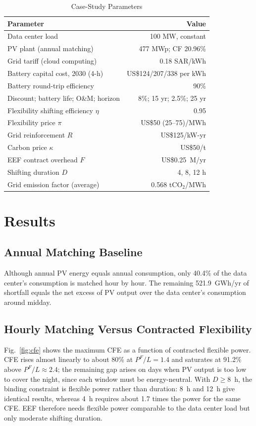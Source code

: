 \documentclass[conference]{IEEEtran}
\begin{document}
\begin{table}[!t]
\centering
\caption{Case-Study Parameters}
\label{tab:params}
\footnotesize
\setlength{\tabcolsep}{3pt}
\begin{tabular}{@{}lr@{}}
\toprule
Parameter & Value \\
\midrule
Data center load & 100 MW, constant \\
PV plant (annual matching) & 477 MWp; CF 20.96\% \cite{pvgis} \\
Grid tariff (cloud computing) & 0.18 SAR/kWh \cite{kapsarcdc} \\
Battery capital cost, 2030 (4-h) & US\$124/207/338 per kWh \cite{nrelbess2025} \\
Battery round-trip efficiency & 90\% \\
Discount; battery life; O\&M; horizon & 8\%; 15 yr; 2.5\%; 25 yr \\
Flexibility shifting efficiency $\eta$ & 0.95 \\
Flexibility price $\pi$ & US\$50 (25--75)/MWh \\
Grid reinforcement $R$ & US\$125/kW-yr \\
Carbon price $\kappa$ & US\$50/t \\
EEF contract overhead $F$ & US\$0.25~M/yr \\
Shifting duration $D$ & 4, 8, 12 h \\
Grid emission factor (average) & 0.568 tCO$_2$/MWh \cite{kfupmghg} \\
\bottomrule
\end{tabular}
\end{table}

\section{Results}
\subsection{Annual Matching Baseline}
Although annual PV energy equals annual consumption, only 40.4\% of the data center's consumption is matched hour by hour. The remaining 521.9~GWh/yr of shortfall equals the net excess of PV output over the data center's consumption around midday.

\subsection{Hourly Matching Versus Contracted Flexibility}
Fig.~\ref{fig:cfe} shows the maximum CFE as a function of contracted flexible power. CFE rises almost linearly to about 80\% at $P^F/L=1.4$ and saturates at 91.2\% above $P^F/L\approx 2.4$; the remaining gap arises on days when PV output is too low to cover the night, since each window must be energy-neutral. With $D\ge 8$~h, the binding constraint is flexible power rather than duration: 8~h and 12~h give identical results, whereas 4~h requires about 1.7 times the power for the same CFE. EEF therefore needs flexible power comparable to the data center load but only moderate shifting duration.
\end{document}
